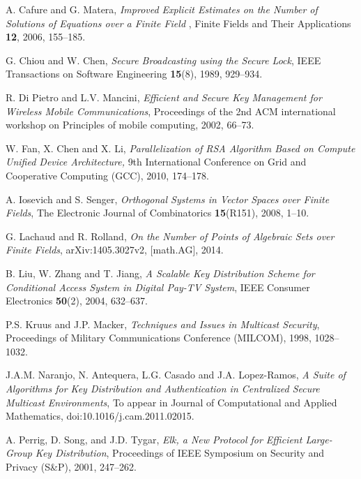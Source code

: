 \documentclass[a4paper,11pt]{amsart}
\theoremstyle{definition}
\begin{document}
\begin{thebibliography}{99}



 {\sc A. Cafure and G. Matera}, {\em Improved Explicit Estimates on the Number of Solutions of Equations over a Finite Field }, Finite Fields and Their Applications {\bf 12}, 2006,
  155--185.

 {\sc G. Chiou and W. Chen}, {\em Secure Broadcasting
    using the Secure Lock}, IEEE Transactions on Software Engineering {\bf 15}(8), 1989,
  929--934.

 {\sc R. Di Pietro and L.V. Mancini},
  {\em Efficient and Secure Key Management for Wireless Mobile
    Communications}, Proceedings of the 2nd ACM international
  workshop on Principles of mobile computing, 2002, 66--73.

 {\sc W. Fan, X. Chen and X. Li,} {\em Parallelization
    of RSA Algorithm Based on Compute Unified Device Architecture,}
  {\rm 9th International
    Conference on Grid and Cooperative Computing (GCC), 2010, 174--178.}



 {\sc A. Iosevich and S. Senger}, {\em Orthogonal
    Systems in Vector Spaces over Finite Fields}, The Electronic
  Journal of Combinatorics {\bf 15}(R151), 2008, 1--10.

{\sc G. Lachaud and R. Rolland}, {\em On the Number of Points of Algebraic Sets over Finite Fields}, arXiv:1405.3027v2, [math.AG], 2014.


 {\sc B. Liu, W. Zhang and T. Jiang}, {\em A Scalable Key
   Distribution Scheme for Conditional Access System in Digital
   Pay-TV System}, IEEE Consumer Electronics {\bf 50}(2), 2004,
  632--637.

 {\sc P.S. Kruus and J.P. Macker},
  {\em Techniques and Issues in Multicast Security}, Proceedings of
  Military Communications Conference (MILCOM), 1998, 1028--1032.

 {\sc J.A.M. Naranjo, N. Antequera, L.G. Casado and
    J.A.  Lopez-Ramos}, {\em A Suite of Algorithms for Key
    Distribution and Authentication in Centralized Secure Multicast
    Environments}, To appear in Journal of Computational and Applied
  Mathematics, doi:10.1016/j.cam.2011.02015.

 {\sc A. Perrig, D. Song, and J.D. Tygar}, {\em Elk, a
    New Protocol for Efficient Large-Group Key Distribution},
  Proceedings of IEEE Symposium on Security and Privacy (S\&P), 2001,
  247--262.


\end{thebibliography}
\end{document}
